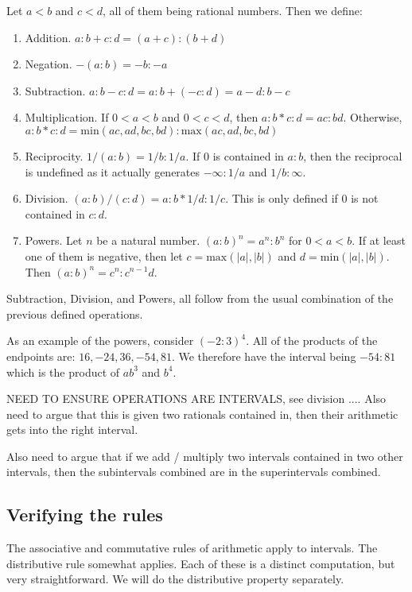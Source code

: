 \documentclass[12pt]{article}
\theoremstyle{remark}
\begin{document}
Let $a<b$ and $c<d$, all of them being rational numbers. Then we define:
\begin{enumerate}
    \item Addition. $a:b + c:d = (a+c):(b+d)$
    \item Negation. $-(a:b) = -b:-a$
    \item Subtraction. $a:b - c:d = a:b + (-c:d) = a-d:b-c$
    \item Multiplication. If $0<a<b$ and $0<c<d$, then $a:b*c:d = ac:bd$. Otherwise, $a:b * c:d = \mathrm{min}(ac, ad, bc, bd): \mathrm{max}(ac,ad,bc,bd)$
    \item Reciprocity. $1/(a:b) = 1/b:1/a$. If 0 is contained in $a:b$, then the reciprocal is undefined as it actually generates $-\infty:1/a$ and $1/b:\infty$. 
    \item Division. $(a:b) / (c:d) = a:b * 1/d:1/c$. This is only defined if 0 is not contained in $c:d$.
    \item Powers. Let $n$ be a natural number. $(a:b)^n = a^n:b^n$ for $0 < a < b$. If at least one of them is negative, then let $c = \mathrm{max} (|a|, |b|)$ and $d=\mathrm{min}(|a|, |b|)$. Then $(a:b)^n = c^n: c^{n-1}d$. 
\end{enumerate}

Subtraction, Division, and Powers, all follow from the usual combination of the previous defined operations. 

As an example of the powers, consider $(-2:3)^4$. All of the products of the endpoints are: $16, -24, 36, -54, 81$. We therefore have the interval being $-54:81$ which is the product of $ab^3$ and $b^4$. 

NEED TO ENSURE OPERATIONS ARE INTERVALS, see division ....  
Also need to argue that this is given two rationals contained in, then their arithmetic gets into the right interval. 

Also need to argue that if we add / multiply two intervals contained in two other intervals, then the subintervals combined are in the superintervals combined. 


\subsection{Verifying the rules}

The associative and commutative rules of arithmetic apply to intervals. The distributive rule somewhat applies. Each of these is a distinct computation, but very straightforward. We will do the distributive property separately. 
\end{document}
